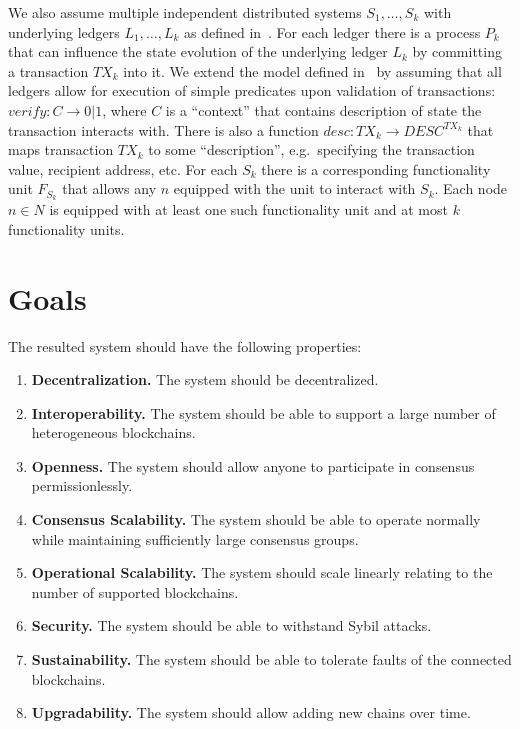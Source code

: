 \documentclass{article}
\begin{document}
\begin{sloppypar}
        We also assume multiple independent distributed systems ${S_1, \dots, S_k}$ with underlying ledgers ${L_1, \dots, L_k}$ as defined in~\cite{cryptoeprint:2019/1128}.
        For each ledger there is a process $P_k$ that can influence the state evolution of the underlying ledger $L_k$ by committing a transaction $TX_k$ into it.
        We extend the model defined in~\cite{cryptoeprint:2019/1128} by assuming that all ledgers allow for execution of simple predicates upon validation of transactions:
        ${verify: C \rightarrow 0 | 1}$, where $C$ is a \enquote{context} that contains description of state the transaction interacts with.
        There is also a function ${desc: TX_k \rightarrow DESC^{TX_k}}$ that maps transaction $TX_k$ to some \enquote{description}, e.g.\ specifying the transaction value, recipient address, etc.
        For each  $S_k$ there is a corresponding functionality unit $F_{S_k}$ that allows any $n$ equipped with the unit to interact with $S_k$.
        Each node $n \in N$ is equipped with at least one such functionality unit and at most $k$ functionality units.

        \section{Goals}\label{sec:goals}

        The resulted system should have the following properties:
        \begin{enumerate}
            \item \textbf{Decentralization.} The system should be decentralized.
            \item \textbf{Interoperability.} The system should be able to support a large number of heterogeneous blockchains.
            \item \textbf{Openness.} The system should allow anyone to participate in consensus permissionlessly.
            \item \textbf{Consensus Scalability.} The system should be able to operate normally while maintaining sufficiently large consensus groups.
            \item \textbf{Operational Scalability.} The system should scale linearly relating to the number of supported blockchains.
            \item \textbf{Security.} The system should be able to withstand Sybil attacks.
            \item \textbf{Sustainability.} The system should be able to tolerate faults of the connected blockchains.
            \item \textbf{Upgradability.} The system should allow adding new chains over time.
        \end{enumerate}



\end{sloppypar}
\end{document}
